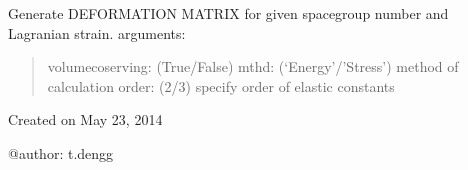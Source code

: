 \documentclass[letterpaper,10pt,english]{sphinxmanual}
\begin{document}
\begin{fulllineitems}
\label{index:distort.Distort}
Generate DEFORMATION MATRIX for given spacegroup number and Lagranian strain.
arguments:
\begin{quote}

volumecoserving: (True/False)
mthd: (`Energy'/'Stress') method of calculation
order: (2/3) specify order of elastic constants
\end{quote}

\end{fulllineitems}

\label{index:module-elatoms}
Created on May 23, 2014

@author: t.dengg
\end{document}
